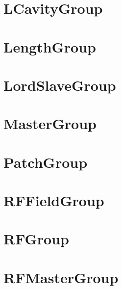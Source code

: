 \section{LCavityGroup}
\label{s:lcavity.g}

\section{LengthGroup}
\label{s:length.g}

\section{LordSlaveGroup}
\label{s:lord.slave.g}

\section{MasterGroup}
\label{s:master.g}

\section{PatchGroup}
\label{s:patch.g}

\section{RFFieldGroup}
\label{s:rffield.g}

\section{RFGroup}
\label{s:rf.g}

\section{RFMasterGroup}
\label{s:rfmaster.g}

